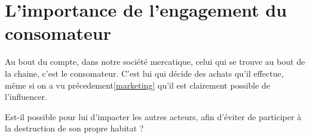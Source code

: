 \section{L'importance de l'engagement du consomateur}

\smallbreak Au bout du compte, dans notre société mercatique, celui qui se trouve au bout de la chaine, c'est le consomateur.
C'est lui qui décide des achats qu'il effectue, même si on a vu précedement\ref{marketing} qu'il est clairement possible de l'influencer.

Est-il possible pour lui d'impacter les autres acteurs, afin d'éviter de participer à la destruction de son propre habitat ?
